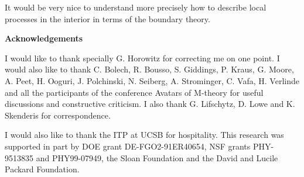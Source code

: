 


It would be very nice to understand more precisely how to describe 
local processes in the interior in terms of the boundary theory. 


{\bf Acknowledgements }


I would like to thank specially G. Horowitz for correcting me on one
 point. I would also like to thank 
  C. Bolech, R. Bousso, S. Giddings, P. Kraus, G. Moore, 
 A. Peet, H. Ooguri, J. Polchinski,  N. Seiberg, A. Strominger, C. Vafa,
H. Verlinde  
and all the participants of the conference Avatars of M-theory for
useful discussions and constructive  criticism.
I also thank G. Lifschytz, D. Lowe and K. Skenderis for correspondence. 



I would also like to thank the ITP at UCSB  for hospitality. 
This  research 
was supported in part by DOE grant DE-FGO2-91ER40654,
NSF grants PHY-9513835 and PHY99-07949, the Sloan Foundation and the 
David and Lucile Packard Foundation.




\listrefs

\bye





 














